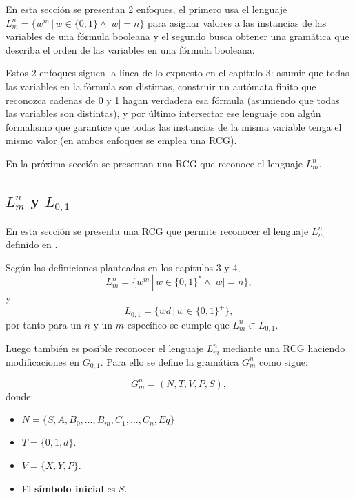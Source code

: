 \documentclass[12pt]{article}
\begin{document}
En esta sección se presentan 2 enfoques, el primero usa el lenguaje $L^n_m=\{w^m\,|\,w\in\{0,1\} \wedge |w|=n\}$ para asignar valores
a las instancias de las variables de una fórmula booleana y el segundo busca obtener una gramática
que describa el orden de las variables en una fórmula booleana.

Estos 2 enfoques siguen la línea de lo expuesto en el capítulo 3:
asumir que todas las variables en
la fórmula son distintas, construir un autómata finito que reconozca cadenas de 0 y 1 hagan verdadera esa
fórmula (asumiendo que todas las variables son distintas), y por último intersectar ese lenguaje con algún
formalismo que garantice que todas las instancias de la misma variable tenga el mismo valor (en ambos enfoques
se emplea una RCG).

En la próxima sección se presentan una RCG que reconoce el lenguaje $L^n_m$.

\subsection{$L^n_m$ y $L_{0,1}$}

En esta sección se presenta una RCG que permite reconocer el lenguaje $L^n_m$ definido en \cite{aSMSAT}.

Según las definiciones planteadas en los capítulos 3 y 4,
$$L^n_m=\{w^m\,|\,w\in\{0,1\}^* \wedge |w|=n\},$$
y
$$L_{0,1}=\{wd \,|\,w\in \{0,1\}^+\},$$
por tanto para un $n$ y un $m$ específico se cumple que $L^n_m \subset L_{0,1}$.

Luego también es posible reconocer el lenguaje $L^n_m$ mediante una RCG haciendo modificaciones en $G_{0,1}$. Para ello
se define la gramática $G^n_m$ como sigue:

\[
    G^n_m = (N, T, V, P, S),
\]
donde:

\begin{itemize}
    \item $N=\{S,A,B_0,\ldots,B_m,C_1,\ldots,C_n,Eq\}$
    \item $T=\{0,1,d\}$.
    \item $V=\{X,Y,P\}$.
    \item El \textbf{símbolo inicial} es $S$.
\end{itemize}
\end{document}
